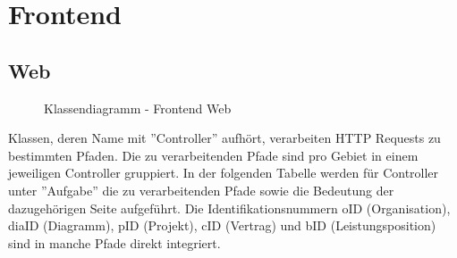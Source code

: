 
\section{Frontend}

\subsection{Web}

\begin{figure}[h]
	\centering
	\caption{Klassendiagramm - Frontend Web}
	\label{fig:klassendiagramm-web}
\end{figure}

\noindent
Klassen, deren Name mit ''Controller'' aufhört, verarbeiten HTTP Requests zu bestimmten Pfaden.
Die zu verarbeitenden Pfade sind pro Gebiet in einem jeweiligen Controller gruppiert.
In der folgenden Tabelle werden für Controller unter ''Aufgabe'' die zu verarbeitenden Pfade sowie die Bedeutung der dazugehörigen Seite aufgeführt.
Die Identifikationsnummern oID (Organisation), diaID (Diagramm), pID (Projekt), cID (Vertrag) und bID (Leistungsposition) sind in manche Pfade direkt integriert. \\

